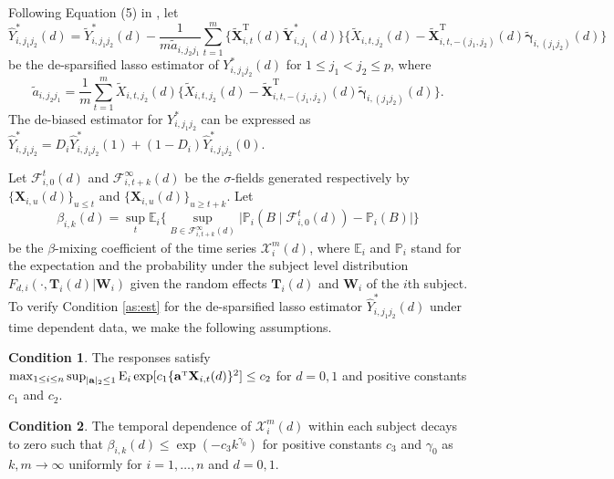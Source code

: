 \documentclass[12pt]{article}
\def\T{{ \mathrm{\scriptscriptstyle T} }}
\theoremstyle{definition}
\newtheorem{as}{Condition}
\newcommand{\E}{\rm E}
\newcommand{\bT}{{\mathbf T}}
\newcommand{\bW}{{\mathbf W}}
\newcommand{\bX}{{\mathbf X}}
\newcommand{\bY}{{\mathbf Y}}
\newcommand{\ba}{{\mathbf a}}
\newcommand{\bgamma}{\boldsymbol{\gamma}}
\begin{document}
Following Equation (5) in \cite{vanderGeerRitov2014}, let 
$$\hat{Y}_{i, j_1 j_2}^{\ast}(d) = \tilde{Y}_{i, j_1 j_2}^{\ast}(d) - \frac{1}{m \tilde{a}_{i, j_2j_1}}\sum_{t = 1}^{m}\{\tilde{\bX}_{i, t}^{\T}(d) \tilde{\bY}_{i, j_1}^{\ast}(d)\}\{\tilde{X}_{i, t, j_2}(d) - \tilde{\bX}_{i, t, -(j_1, j_2)}^{\T}(d)\tilde{\bgamma}_{i, (j_1j_2)}(d) \} $$
be the de-sparsified lasso estimator of ${Y}_{i, j_1 j_2}^{\ast}(d)$ for $1 \leq j_1 < j_2 \leq p$, where $$\tilde{a}_{i, j_2j_1} = \frac{1}{m}\sum_{t  = 1}^{m} \tilde{X}_{i, t, j_2}(d) \{\tilde{X}_{i, t, j_2}(d) - \tilde{\bX}_{i, t, -(j_1, j_2)}^{\T}(d)\tilde{\bgamma}_{i, (j_1j_2)}(d) \}.$$
The de-biased estimator for $Y_{i, j_1 j_2}^{\ast}$ can be expressed as $\hat{Y}_{i, j_1 j_2}^{\ast} = D_i \hat{Y}_{i, j_1 j_2}^{\ast}(1) + (1 - D_i) \hat{Y}_{i, j_1 j_2}^{\ast}(0)$.

Let $\mathscr{F}_{i, 0}^t(d)$ and $\mathscr{F}_{i, t+k}^{\infty}(d)$ be the $\sigma$-fields generated respectively by $\{\bX_{i, u}(d)\}_{u\leq t}$ and $\{\bX_{i, u}(d)\}_{u\geq t+k}$.
Let
\[
\beta_{i, k}(d) = \sup_t\mathbb{E}_{i}\bigg\{\sup_{B\in\mathscr{F}_{i, t+k}^{\infty}(d)}\big|\mathbb{P}_{i}(B \mid \mathscr{F}_{i, 0}^t(d))-\mathbb{P}_{i}(B)\big|\bigg\}
\]
be the $\beta$-mixing coefficient of the time series $\mathcal{X}_i^m(d)$, where $\mathbb{E}_{i}$ and $\mathbb{P}_{i}$ stand for the expectation and the probability under the subject level distribution $F_{d, i}(\cdot, \bT_{i}(d) | \bW_{i})$ given the random effects $\bT_{i}(d)$ and $\bW_i$ of the $i$th subject.
To verify Condition \ref{as:est} for the de-sparsified lasso estimator $\hat{Y}_{i, j_1 j_2}^{\ast}(d)$ under time dependent data,
we make the following assumptions.

\begin{as}
The responses satisfy 
$\max_{1 \leq i \leq n} \sup_{|\ba|_2 \leq 1} {\E}_{i} \exp [ c_1 \{\ba^{\T} \bX_{i, t}(d)\}^2 ] \leq c_2
$ for $d = 0, 1$ and positive constants $c_1$ and $c_2$.
\label{as:moment}\end{as}

\begin{as}
The temporal dependence of $\mathcal{X}_{i}^m(d)$ within each subject decays to zero such that $\beta_{i, k}(d) \leq \exp(-c_3 k^{\gamma_0})$ for positive constants $c_3$ and $\gamma_0$ as $k, m \rightarrow\infty$ uniformly for $i = 1, \ldots, n$ and $d = 0, 1$.
\label{as:dependence}\end{as}
\end{document}
